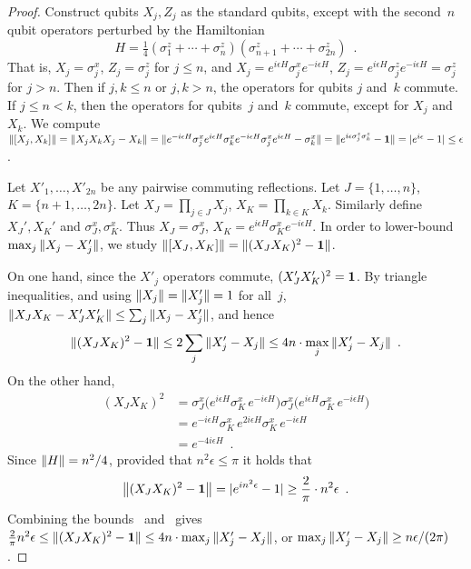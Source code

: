 \documentclass[preprintnumbers,11pt,onecolumn]{article}
\begin{document}
\begin{proof}
Construct qubits $X_j, Z_j$ as the standard qubits, except with the second~$n$ qubit operators perturbed by the Hamiltonian 
\begin{equation*}
H = \tfrac14 (\sigma^z_1 + \cdots + \sigma^z_n) (\sigma^z_{n+1} + \cdots + \sigma^z_{2n})
 \enspace .
\end{equation*}
That is, $X_j = \sigma^x_j$, $Z_j = \sigma^z_j$ for $j \leq n$, and $X_j = e^{i \epsilon H} \sigma^x_j  e^{-i \epsilon H}$, $Z_j = e^{i \epsilon H} \sigma^z_j  e^{-i \epsilon H} = \sigma^z_j$ for $j > n$.  Then if $j, k \leq n$ or $j, k > n$, the operators for qubits $j$ and~$k$ commute.  If $j \leq n < k$, then the operators for qubits~$j$ and~$k$ commute, except for $X_j$ and $X_k$.  We compute ${\| [X_j, X_k] \|} = {\| X_j X_k X_j - X_k \|} = {\|  e^{-i \epsilon H} \sigma^x_j e^{i \epsilon H} \sigma^x_k e^{-i \epsilon H} \sigma^x_j e^{i \epsilon H} - \sigma^x_k  \|} = {\|  e^{i \epsilon \sigma^z_j \sigma^z_k} - \boldsymbol{1}  \|} = {\lvert e^{i \epsilon} - 1\rvert} \leq \epsilon$.  

Let $X'_1, \ldots, X'_{2n}$ be any pairwise commuting reflections.  Let $J = \{1, \ldots, n\}$, $K = \{n+1, \ldots, 2n\}$.  Let $X_J = \prod_{j \in J} X_j$, $X_K = \prod_{k \in K} X_k$.  Similarly define $X_J', X_K'$ and $\sigma^x_J, \sigma^x_K$.  Thus $X_J = \sigma^x_J$, $X_K = e^{i \epsilon H} \sigma^x_K e^{-i \epsilon H}$.  In order to lower-bound $\max_j {\| X_j - X_j' \|}$, we study ${\| [X_J, X_K] \|} = {\| (X_J X_K)^2 - \boldsymbol{1} \|}$.  

On one hand, since the $X'_j$ operators commute, $(X_J' X_K')^2 = \boldsymbol{1}$.  By triangle inequalities, and using ${\| X_j \|} = {\| X_j' \|} = 1$ for all~$j$, ${\| X_J X_K - X_J' X_K' \|} \leq \sum_j {\| X_j - X_j' \|}$, and hence 
\begin{equation} \label{e:movementlowerbound1}
\norm{(X_J X_K)^2 - \identity} \leq 2 \sum_j \norm{X_j' - X_j} \leq 4 n \cdot \max_j \norm{X_j' - X_j}
 \enspace .  
\end{equation}
On the other hand, 
\begin{align*}
(X_J X_K)^2
&= \sigma^x_J \big( e^{i \epsilon H} \sigma^x_K \, e^{-i \epsilon H} \big) \sigma^x_J \big( e^{i \epsilon H} \sigma^x_K \, e^{-i \epsilon H} \big) \\
&= e^{-i \epsilon H} \sigma^x_K \, e^{2 i \epsilon H} \sigma^x_K \, e^{-i \epsilon H} \\
&= e^{-4 i \epsilon H}
 \enspace .
\end{align*}
Since ${\| H \|} = n^2/4$, provided that $n^2 \epsilon \leq \pi$ it holds that 
\begin{equation} \label{e:movementlowerbound2}
\bignorm{(X_J X_K)^2 - \identity} = \abs{e^{i n^2 \epsilon} - 1} \geq \frac{2}{\pi} \cdot n^2 \epsilon
 \enspace .
\end{equation}
Combining the bounds~ and~ gives $\frac{2}{\pi} n^2 \epsilon \leq {\| (X_J X_K)^2 - \ensuremath{\boldsymbol{1}}\|} \leq 4 n \cdot \max_j {\| X_j' - X_j \|}$, or $\max_j {\| X_j' - X_j \|} \geq n \epsilon / (2 \pi)$.  
\end{proof}
\end{document}
